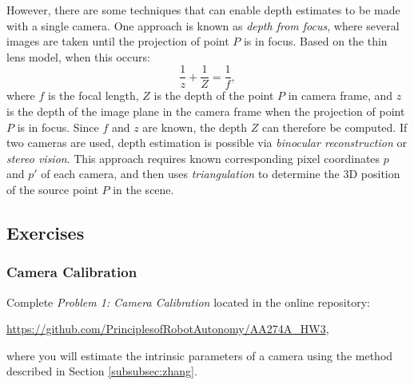 However, there are some techniques that can enable depth estimates to be made with a single camera. One approach is known as \textit{depth from focus}, where several images are taken until the projection of point $P$ is in focus. Based on the thin lens model, when this occurs:
\begin{equation*}
    \frac{1}{z} + \frac{1}{Z} = \frac{1}{f},
\end{equation*}
where $f$ is the focal length, $Z$ is the depth of the point $P$ in camera frame, and $z$ is the depth of the image plane in the camera frame when the projection of point $P$ is in focus. Since $f$ and $z$ are known, the depth $Z$ can therefore be computed.
If two cameras are used, depth estimation is possible via \textit{binocular reconstruction} or \textit{stereo vision}. This approach requires known corresponding pixel coordinates $p$ and $p'$ of each camera, and then uses \textit{triangulation} to determine the 3D position of the source point $P$ in the scene.

\subsection{Exercises}
\subsubsection{Camera Calibration}
Complete \textit{Problem 1: Camera Calibration} located in the online repository:

\vspace{\baselineskip}

\url{https://github.com/PrinciplesofRobotAutonomy/AA274A_HW3},

\vspace{\baselineskip}

where you will estimate the intrinsic parameters of a camera using the method described in Section \ref{subsubsec:zhang}.
